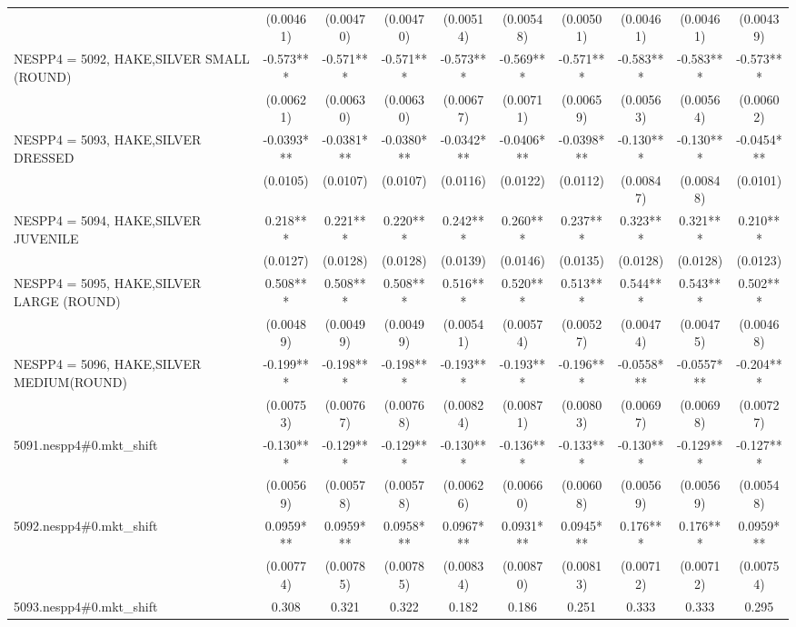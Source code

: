 \begin{tabular}{lccccccccc}
 & (0.00461) & (0.00470) & (0.00470) & (0.00514) & (0.00548) & (0.00501) & (0.00461) & (0.00461) & (0.00439) \\
NESPP4 = 5092, HAKE,SILVER SMALL (ROUND) & -0.573*** & -0.571*** & -0.571*** & -0.573*** & -0.569*** & -0.571*** & -0.583*** & -0.583*** & -0.573*** \\
 & (0.00621) & (0.00630) & (0.00630) & (0.00677) & (0.00711) & (0.00659) & (0.00563) & (0.00564) & (0.00602) \\
NESPP4 = 5093, HAKE,SILVER DRESSED & -0.0393*** & -0.0381*** & -0.0380*** & -0.0342*** & -0.0406*** & -0.0398*** & -0.130*** & -0.130*** & -0.0454*** \\
 & (0.0105) & (0.0107) & (0.0107) & (0.0116) & (0.0122) & (0.0112) & (0.00847) & (0.00848) & (0.0101) \\
NESPP4 = 5094, HAKE,SILVER JUVENILE & 0.218*** & 0.221*** & 0.220*** & 0.242*** & 0.260*** & 0.237*** & 0.323*** & 0.321*** & 0.210*** \\
 & (0.0127) & (0.0128) & (0.0128) & (0.0139) & (0.0146) & (0.0135) & (0.0128) & (0.0128) & (0.0123) \\
NESPP4 = 5095, HAKE,SILVER LARGE (ROUND) & 0.508*** & 0.508*** & 0.508*** & 0.516*** & 0.520*** & 0.513*** & 0.544*** & 0.543*** & 0.502*** \\
 & (0.00489) & (0.00499) & (0.00499) & (0.00541) & (0.00574) & (0.00527) & (0.00474) & (0.00475) & (0.00468) \\
NESPP4 = 5096, HAKE,SILVER MEDIUM(ROUND) & -0.199*** & -0.198*** & -0.198*** & -0.193*** & -0.193*** & -0.196*** & -0.0558*** & -0.0557*** & -0.204*** \\
 & (0.00753) & (0.00767) & (0.00768) & (0.00824) & (0.00871) & (0.00803) & (0.00697) & (0.00698) & (0.00727) \\
5091.nespp4\#0.mkt\_shift & -0.130*** & -0.129*** & -0.129*** & -0.130*** & -0.136*** & -0.133*** & -0.130*** & -0.129*** & -0.127*** \\
 & (0.00569) & (0.00578) & (0.00578) & (0.00626) & (0.00660) & (0.00608) & (0.00569) & (0.00569) & (0.00548) \\
5092.nespp4\#0.mkt\_shift & 0.0959*** & 0.0959*** & 0.0958*** & 0.0967*** & 0.0931*** & 0.0945*** & 0.176*** & 0.176*** & 0.0959*** \\
 & (0.00774) & (0.00785) & (0.00785) & (0.00834) & (0.00870) & (0.00813) & (0.00712) & (0.00712) & (0.00754) \\
5093.nespp4\#0.mkt\_shift & 0.308 & 0.321 & 0.322 & 0.182 & 0.186 & 0.251 & 0.333 & 0.333 & 0.295 \\

\end{tabular}
